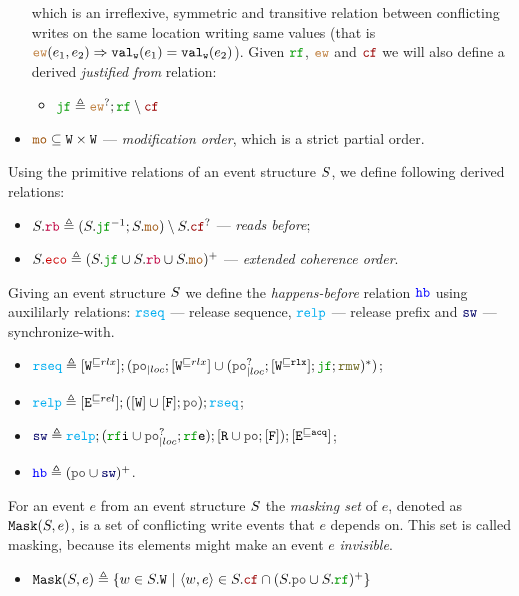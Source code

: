 \documentclass[12pt]{article}
\begin{document}
\begin{definition}
\begin{itemize}
    which is an irreflexive, symmetric and transitive relation between conflicting writes on the
    same location writing same values 
    (that is $\lEW(e_1, e_2) \Rightarrow \lVALW(e_1) = \lVALW(e_2)$).
    Given $\lRF$, $\lEW$ and $\lCF$ we will also define a derived \emph{justified from} relation:
    \begin{itemize}
      \item $\lJF \defeq \lEW^?;\lRF \setminus \lCF$
    \end{itemize}
  \item $\lMO \subseteq \lW \times \lW$ --- \emph{modification order}, which is a strict partial order.
  \end{itemize}
\end{definition}

\begin{definition}
  Using the primitive relations of an event structure $S$,
  we define following derived relations:
  \begin{itemize}
    \item $\lES.\lRB \defeq (\lES.\lJF^{-1};\lES.\lMO) \setminus \lES.\lCF^?$ --- 
      \emph{reads before};
    \item $\lES.\lECO \defeq (\lES.\lJF \cup \lES.\lRB \cup \lES.\lMO)^+$ --- 
      \emph{extended coherence order}.
  \end{itemize}
\end{definition}

\begin{definition}
  Giving an event structure $S$ we define the \emph{happens-before} relation $\lHB$
  using auxililarly relations: 
  $\lRSEQ$ --- release sequence,
  $\lRELP$ --- release prefix and
  $\lSW$ --- synchronize-with.
  \begin{itemize}
  \item $\lRSEQ \defeq [\lWsqeq{rlx}];(\lmakeLoc{\lPO};[\lWsqeq{rlx}] \cup 
    (\lmakeLoc{\lPO^?};[\lWsqeq{\rlx}];\lJF;\lRMW)^*)$;
  \item $\lRELP \defeq [\lEsqeq{rel}];([\lW] \cup [\lF];\lPO);\lRSEQ$;
  \item $\lSW \defeq \lRELP; (\lRFI \cup \lmakeLoc{\lPO^?};\lRFE); [\lR \cup \lPO;[\lF]);[\lEsqeq{\acq}]$;
  \item $\lHB \defeq (\lPO \cup \lSW)^+$.
  \end{itemize}
\end{definition}

\begin{definition}
  For an event $e$ from an event structure $S$
  the \emph{masking set} of $e$, denoted as ${\mathtt{Mask}}(S, e)$,
  is a set of conflicting write events that $e$ depends on.
  This set is called masking, because its elements might make an event $e$ \emph{invisible}.
  \begin{itemize}
  \item $\lMASK(\lES, e) \defeq
    \{w \in \lES.\lW ~|~ \tup{w, e} \in \lES.\lCF \cap (\lES.\lPO \cup \lES.\lRF)^+ \}$
  \end{itemize}
\end{definition}
\end{document}
